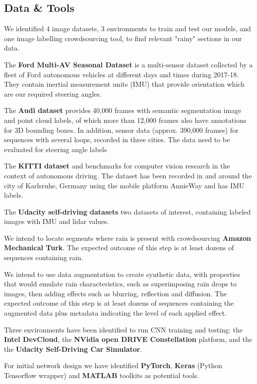 \subsection{Data \& Tools}

We identified 4 image datasets, 3 environments to train and test our models, and one image labelling crowdsourcing tool, to find relevant "rainy" sections in our data.

The \textbf{Ford Multi-AV Seasonal Dataset} is a multi-sensor dataset collected by a fleet of Ford autonomous vehicles at different days and times during 2017-18. They contain inertial measurement units (IMU) that provide orientation which are our required steering angles.

The \textbf{Audi dataset} provides 40,000 frames with semantic segmentation image and point cloud labels, of which more than 12,000 frames also have annotations for 3D bounding boxes. In addition, sensor data (approx. 390,000 frames) for sequences with several loops, recorded in three cities. The data need to be evaluated for steering angle labels

The \textbf{KITTI dataset} and benchmarks for computer vision research in the context of autonomous driving. The dataset has been recorded in and around the city of Karlsruhe, Germany using the mobile platform AnnieWay and has IMU labels.

The \textbf{Udacity self-driving datasets} two datasets of interest, containing labeled images with IMU and lidar values.


We intend to locate segments where rain is present with crowdsourcing \textbf{Amazon Mechanical Turk}. The expected outcome of this step is at least dozens of sequences containing rain.

We intend to use data augmentation to create synthetic data, with properties that would emulate rain characteristics, such as superimposing rain drops to images, then adding effects such as blurring, reflection and diffusion.  
The expected outcome of this step is at least dozens of sequences containing the augmented data plus metadata indicating the level of each applied effect.

Three environments have been identified to run CNN training and testing: the \textbf{Intel DevCloud}, the \textbf{NVidia open DRIVE Constellation} platform, and the the \textbf{Udacity Self-Driving Car Simulator}. 

For initial network design we have identified \textbf{PyTorch}, \textbf{Keras} (Python Tensorflow wrapper) and \textbf{MATLAB} toolkits as potential tools.

